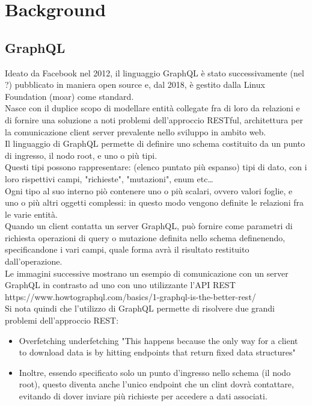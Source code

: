 \documentclass[a4paper, 12pt]{scrartcl}
\begin{document}
  \section*{Background}
    \subsection*{GraphQL}
      Ideato da Facebook nel 2012, il linguaggio GraphQL è stato successivamente (nel ?) pubblicato in maniera open source e, dal 2018, è gestito dalla Linux Foundation (moar) come standard.\\
      Nasce con il duplice scopo di modellare entità collegate fra di loro da relazioni e di fornire una soluzione a noti problemi dell'approccio RESTful, architettura per la comunicazione client server prevalente nello sviluppo in ambito web.\\
      Il linguaggio di GraphQL permette di definire uno schema costituito da un punto di ingresso, il nodo root, e uno o più tipi.\\
      
      Questi tipi possono rappresentare: (elenco puntato più espanso) tipi di dato, con i loro rispettivi campi, "richieste", "mutazioni", enum etc\dots\\
      
      Ogni tipo al suo interno piò contenere uno o più scalari, ovvero valori foglie, e uno o più altri oggetti complessi: in questo modo vengono definite le relazioni fra le varie entità.\\

      Quando un client contatta un server GraphQL, può fornire come parametri di richiesta operazioni di query o mutazione definita nello schema definenendo, specificandone i vari campi, quale forma avrà il risultato restituito dall'operazione.\\

      Le immagini successive mostrano un esempio di comunicazione con un server GraphQL in contrasto ad uno con uno utilizzante l'API REST
      https://www.howtographql.com/basics/1-graphql-is-the-better-rest/\\


      Si nota quindi che l'utilizzo di GraphQL permette di risolvere due grandi problemi dell'approccio REST:
      \begin{itemize}
        \item 
        Overfetching underfetching "This happens because the only way for a client to download data is by hitting endpoints that return fixed data structures"
        \item
        Inoltre, essendo specificato solo un punto d'ingresso nello schema (il nodo root), questo diventa anche l'unico endpoint che un clint dovrà contattare, evitando di dover inviare più richieste per accedere a dati associati. 
      \end{itemize}
      
\end{document}
